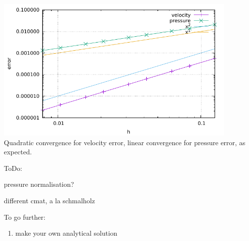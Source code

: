 \begin{center}
\includegraphics[width=12cm]{python_codes/fieldstone_01/errors.pdf}\\
Quadratic convergence for velocity error, 
linear convergence for pressure error, as expected.
\end{center}

ToDo:

pressure normalisation?

different cmat, a la schmalholz

To go further:
\begin{enumerate}
\item make your own analytical solution
\end{enumerate}
